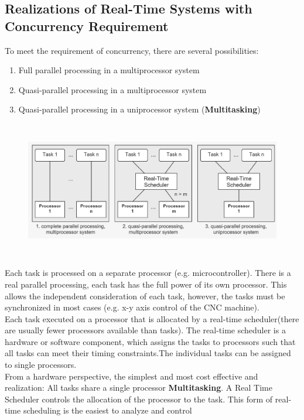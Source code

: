 \subsection{ Realizations of Real-Time Systems with Concurrency Requirement}

To meet the requirement of concurrency, there are several possibilities:

\begin{enumerate}
	\item  Full parallel processing in a multiprocessor system
	\item  Quasi-parallel processing in a multiprocessor system
	\item  Quasi-parallel processing in a uniprocessor system (\textbf{Multitasking})
\end{enumerate}

	\begin{figure}[h]
    \centering
    \includegraphics[width=15cm, height=6cm]{Images/image70.png}
    \label{fig:Fig }
    \end{figure}
    
Each task is processed on a separate processor (e.g. microcontroller). There is a real parallel processing, each task has the full power of its own processor. This allows the independent consideration of each task, however, the tasks must be synchronized in most cases (e.g. x-y axis control of the CNC machine).\\

Each task executed on a processor that is allocated by a real-time scheduler(there are usually fewer processors available than tasks). The real-time scheduler is a hardware or software component, which assigns the tasks to processors such that all tasks can meet their timing constraints.The individual tasks can be assigned to single processors.\\

From a hardware perspective, the simplest and most cost effective and realization: All tasks share a single processor \textbf{Multitasking}. A Real Time Scheduler controls the allocation of the processor to the task. This form of real-time scheduling is the easiest to analyze and control \\ 

